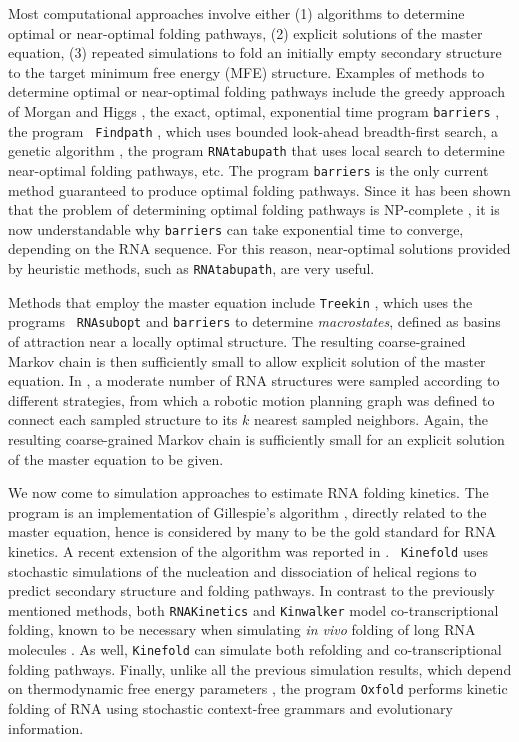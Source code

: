 Most computational approaches involve either (1) algorithms to
determine optimal or near-optimal folding pathways, (2) explicit
solutions of the master equation, (3) repeated simulations to fold an
initially empty secondary structure to the target minimum free energy
(MFE) structure. Examples of methods to determine optimal or
near-optimal folding pathways include the greedy approach of Morgan
and Higgs \cite{morganHiggsBarrier}, the exact, optimal, exponential
time program {\tt barriers} \cite{flammHofacker}, the program {\tt
Findpath} \cite{Flamm.r01}, which uses bounded look-ahead
breadth-first search, a genetic algorithm \cite{Shapiro.jmb01}, the
program {\tt RNAtabupath} that uses local search to determine
near-optimal folding pathways, etc. The program {\tt barriers}
\cite{flammHofacker} is the only current method guaranteed to
produce optimal folding pathways. Since it has been shown that
the problem of determining optimal folding pathways is
NP-complete \cite{Thachuk.psb10}, it is now understandable why
{\tt barriers} can take exponential time to converge, depending
on the RNA sequence. For this reason, near-optimal solutions
provided by heuristic methods, such as {\tt RNAtabupath}, are very useful.

Methods that employ the master equation include {\tt Treekin}
\cite{wolfingerStadler:kinetics}, which uses the programs {\tt
RNAsubopt} \cite{wuchtyFontanaHofackerSchuster} and {\tt barriers}
\cite{flammHofacker} to determine {\em macrostates}, defined as basins
of attraction near a locally optimal structure. The resulting
coarse-grained Markov chain is then sufficiently small to allow explicit
solution of the master equation. In \cite{Tang.jcb05}, a moderate
number of RNA structures were sampled according to different
strategies, from which a robotic motion planning graph was defined
to connect each sampled structure to its $k$ nearest sampled
neighbors. Again, the resulting coarse-grained Markov chain is
sufficiently small for an explicit solution of the master equation to
be given.

We now come to simulation approaches to estimate RNA folding kinetics.
The program \kinfold \cite{flammPhD,flamm} is an implementation
of Gillespie's algorithm \cite{gillespieStochasticSimulation1},
directly related to the master equation, hence is considered by many
to be the gold standard for RNA kinetics. A recent extension of the
\kinfold algorithm was reported in \cite{Aviram.amb12}. {\tt
Kinefold} \cite{Xayaphoummine.nar05} uses stochastic simulations of
the nucleation and dissociation of helical regions to predict
secondary structure and folding pathways. In contrast to the
previously mentioned methods, both {\tt RNAKinetics}
\cite{Danilova.jbcb06} and {\tt Kinwalker} \cite{Geis.jmb08} model
co-transcriptional folding, known to be necessary when simulating
{\em in vivo} folding of long RNA molecules \cite{Lai.r13}. As well,
{\tt Kinefold} can simulate both refolding and co-transcriptional folding
pathways. Finally, unlike all the previous simulation results, which
depend on thermodynamic free energy parameters \cite{Turner.nar10},
the program {\tt Oxfold} \cite{Anderson.b13} performs kinetic folding
of RNA using stochastic context-free grammars and evolutionary
information.

